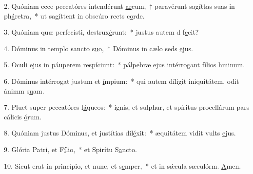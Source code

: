 2. Quóniam ecce peccatóres intendérunt \uline{ar}cum,~† paravérunt sagíttas suas in ph\uline{á}retra,~* ut sagíttent in obscúro rects c\uline{o}rde.\par 
3. Quóniam quæ perfecísti, destrux\uline{é}runt:~* justus autem d f\uline{e}cit?\par 
4. Dóminus in templo sancto s\uline{u}o,~* Dóminus in cælo seds \uline{e}jus.\par 
5. Oculi ejus in páuperem resp\uline{í}ciunt:~* pálpebræ ejus intérrogant fílios hm\uline{i}num.\par 
6. Dóminus intérrogat justum et \uline{í}mpium:~* qui autem díligit iniquitátem, odit ánimm s\uline{u}am.\par 
7. Pluet super peccatóres l\uline{á}queos:~* ignis, et sulphur, et spíritus procellárum pars cálicis \uline{ó}rum.\par 
8. Quóniam justus Dóminus, et justítias dil\uline{é}xit:~* æquitátem vidit vults \uline{e}jus.\par 
9. Glória Patri, et F\uline{í}lio,~* et Spirítu S\uline{a}ncto.\par 
10. Sicut erat in princípio, et nunc, et s\uline{e}mper,~* et in sǽcula sæculórm. \uline{A}men.\par 
